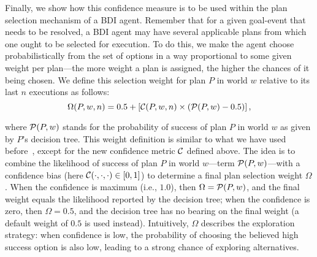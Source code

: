 \newcommand{\cSatisfies}{\psi}



Finally, we show how this confidence measure is to be used within the plan selection mechanism of a BDI agent. Remember that for a given goal-event that needs to be resolved, a BDI agent may have several applicable plans from which one ought to be selected for execution. To do this, we make the agent  choose probabilistically from the set of options in a way proportional to some given weight per plan---the more weight a plan is assigned, the higher the chances of it being chosen. 
We define this selection weight for plan $P$ in world $w$ relative to its last $n$ executions as follows: 
\[
	\Omega(P,w,n) = 0.5 + \left[  \C(P,w,n) \times  \left( \P(P,w) - 0.5 \right)  \right],
\label{eqn:omega}   
\]

\noindent 
where $\P(P,w)$ stands for the probability of success of plan $P$ in world $w$ as given by $P$'s decision tree. 
%
This weight definition is similar to what we have used before~\cite{singh10:extending,singh10:learning}, except for the new confidence metric $\C$ defined above. The idea is to combine the likelihood of success of plan $P$ in world $w$---term $\P(P,w)$---with a confidence bias (here $\C(\cdot,\cdot,\cdot) \in [0,1]$) to determine a final plan selection weight $\Omega$. 
When the confidence is maximum (i.e., $1.0$), then $\Omega = \P(P,w)$, and the final weight equals the likelihood reported by the decision tree; when the confidence is zero, then $\Omega=0.5$, and the decision tree has no bearing on the final weight (a default weight of $0.5$ is used instead).
%
Intuitively, $\Omega$ describes the exploration strategy: when confidence is low, the probability of choosing the believed high success option is also low, leading to a strong chance of exploring alternatives.
